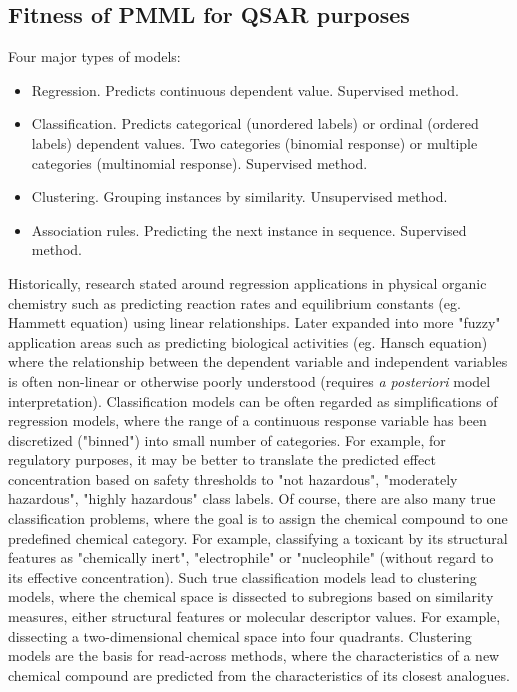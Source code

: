 \documentclass[12pt,letterpaper]{article}
\begin{document}
\subsection{Fitness of PMML for QSAR purposes}
Four major types of models:
\begin{itemize}
  \item Regression. Predicts continuous dependent value.
  Supervised method.
  \item Classification. Predicts categorical (unordered labels) or ordinal 
  (ordered labels) dependent values. Two categories (binomial response) or
  multiple categories (multinomial response). Supervised method.
  \item Clustering. Grouping instances by similarity. Unsupervised method.
  \item Association rules. Predicting the next instance in sequence.
  Supervised method.
\end{itemize}

Historically, research stated around regression applications in physical organic
chemistry such as predicting reaction rates and equilibrium constants (eg. Hammett 
equation) using linear relationships. Later expanded into more "fuzzy" 
application areas such as predicting biological activities (eg. Hansch equation)
where the relationship between the dependent variable and independent variables
is often non-linear or otherwise poorly understood (requires \textit{a posteriori} model 
interpretation). Classification models can be often regarded as simplifications
of regression models, where the range of a continuous response variable has been
discretized ("binned") into small number of categories. For example, for regulatory
purposes, it may be better to translate the predicted effect concentration based
on safety thresholds to "not hazardous", "moderately hazardous", "highly hazardous"
class labels. Of course, there are also many true classification problems, where
the goal is to assign the chemical compound to one predefined chemical category.
For example, classifying a toxicant by its structural features as "chemically inert",
"electrophile" or "nucleophile" (without regard to its effective concentration).
Such true classification models lead to clustering models, where the chemical space
is dissected to subregions based on similarity measures, either structural features
or molecular descriptor values. For example, dissecting a two-dimensional chemical
space into four quadrants. Clustering models are the basis for read-across methods,
where the characteristics of a new chemical compound are predicted from the 
characteristics of its closest analogues.
\end{document}
